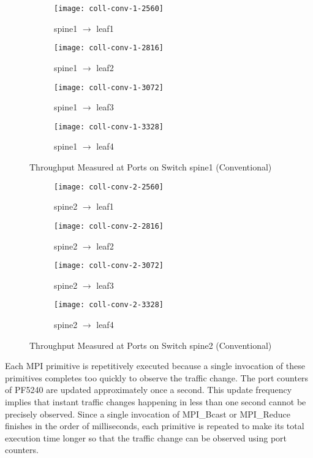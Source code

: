 \begin{figure}
    \centering
    \begin{subfigure}{.45\linewidth}
        \texttt{[image: coll-conv-1-2560]}
        \caption{spine1 $\to$ leaf1}%
        \label{fig:spine1-leaf1-conv}
    \end{subfigure}
    \begin{subfigure}{.45\linewidth}
        \texttt{[image: coll-conv-1-2816]}
        \caption{spine1 $\to$ leaf2}%
        \label{fig:spine1-leaf2-conv}
    \end{subfigure}
    \begin{subfigure}{.45\linewidth}
        \texttt{[image: coll-conv-1-3072]}
        \caption{spine1 $\to$ leaf3}%
        \label{fig:spine1-leaf3-conv}
    \end{subfigure}
    \begin{subfigure}{.45\linewidth}
        \texttt{[image: coll-conv-1-3328]}
        \caption{spine1 $\to$ leaf4}%
        \label{fig:spine1-leaf4-conv}
    \end{subfigure}
    \caption{Throughput Measured at Ports on Switch spine1 (Conventional)}%
    \label{fig:coll-spine1-conv}
\end{figure}

\begin{figure}
    \begin{subfigure}{.45\linewidth}
        \texttt{[image: coll-conv-2-2560]}
        \caption{spine2 $\to$ leaf1}%
        \label{fig:spine2-leaf1-conv}
    \end{subfigure}
    \begin{subfigure}{.45\linewidth}
        \texttt{[image: coll-conv-2-2816]}
        \caption{spine2 $\to$ leaf2}%
        \label{fig:spine2-leaf2-conv}
    \end{subfigure}
    \begin{subfigure}{.45\linewidth}
        \texttt{[image: coll-conv-2-3072]}
        \caption{spine2 $\to$ leaf3}%
        \label{fig:spine2-leaf3-conv}
    \end{subfigure}
    \begin{subfigure}{.45\linewidth}
        \texttt{[image: coll-conv-2-3328]}
        \caption{spine2 $\to$ leaf4}%
        \label{fig:spine2-leaf4-conv}
    \end{subfigure}
    \caption{Throughput Measured at Ports on Switch spine2 (Conventional)}%
    \label{fig:coll-spine2-conv}
\end{figure}

Each MPI primitive is repetitively executed because a single invocation
of these primitives completes too quickly to observe the traffic change.
The port counters of PF5240 are updated approximately once a second.
This update frequency implies that instant traffic changes happening in less
than one second cannot be precisely observed. Since a single invocation of
MPI\_Bcast or MPI\_Reduce finishes in the order of milliseconds, each
primitive is repeated to make its total execution time longer so that the
traffic change can be observed using port counters.

